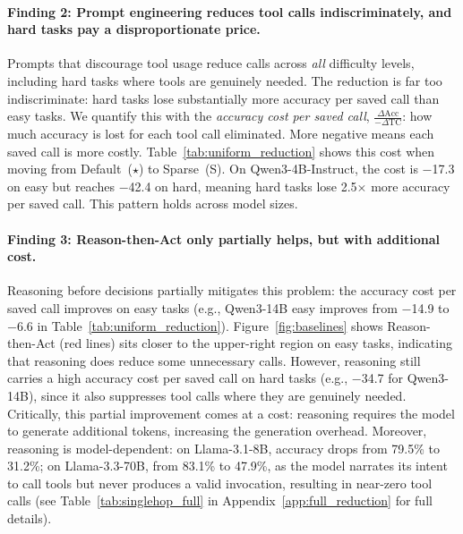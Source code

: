 \paragraph{Finding 2: Prompt engineering reduces tool calls indiscriminately, and hard tasks pay a disproportionate price.}
Prompts that discourage tool usage reduce calls across \emph{all} difficulty levels, including hard tasks where tools are genuinely needed. The reduction is far too indiscriminate: hard tasks lose substantially more accuracy per saved call than easy tasks. We quantify this with the \emph{accuracy cost per saved call}, $\frac{\Delta\text{Acc}}{-\Delta\text{TC}}$: how much accuracy is lost for each tool call eliminated. More negative means each saved call is more costly. Table~\ref{tab:uniform_reduction} shows this cost when moving from Default~($\star$) to Sparse~(S). On Qwen3-4B-Instruct, the cost is $-$17.3 on easy but reaches $-$42.4 on hard, meaning hard tasks lose 2.5$\times$ more accuracy per saved call. This pattern holds across model sizes.
\vspace{-5pt}
\paragraph{Finding 3: Reason-then-Act only partially helps, but with additional cost.}
Reasoning before decisions partially mitigates this problem: the accuracy cost per saved call improves on easy tasks (e.g., Qwen3-14B easy improves from $-$14.9 to $-$6.6 in Table~\ref{tab:uniform_reduction}). Figure~\ref{fig:baselines} shows Reason-then-Act (red lines) sits closer to the upper-right region on easy tasks, indicating that reasoning does reduce some unnecessary calls. However, reasoning still carries a high accuracy cost per saved call on hard tasks (e.g., $-$34.7 for Qwen3-14B), since it also suppresses tool calls where they are genuinely needed. Critically, this partial improvement comes at a cost: reasoning requires the model to generate additional tokens, increasing the generation overhead. Moreover, reasoning is model-dependent: on Llama-3.1-8B, accuracy drops from 79.5\% to 31.2\%; on Llama-3.3-70B, from 83.1\% to 47.9\%, as the model narrates its intent to call tools but never produces a valid invocation, resulting in near-zero tool calls (see Table~\ref{tab:singlehop_full} in Appendix~\ref{app:full_reduction} for full details).
\vspace{-5pt}
